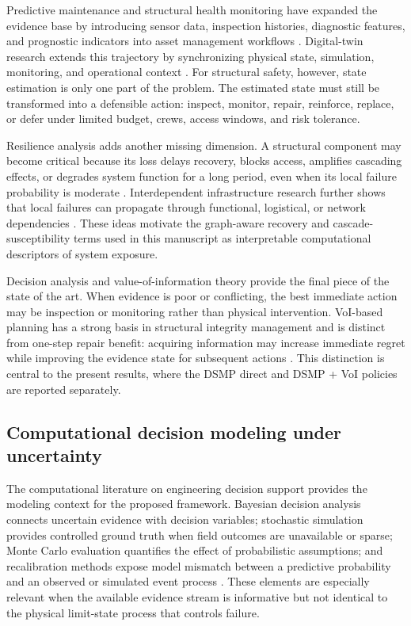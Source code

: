 \documentclass[cmes,article,submit,moreauthors,pdftex]{Definitions/tsp}
\begin{document}
Predictive maintenance and structural health monitoring have expanded the evidence base by introducing sensor data, inspection histories, diagnostic features, and prognostic indicators into asset management workflows \cite{jardine2006,worden2004,carden2004,farrar2007,brownjohn2007}. Digital-twin research extends this trajectory by synchronizing physical state, simulation, monitoring, and operational context \cite{tao2018,tao2019,fuller2020,rasheed2020,boje2020,lu2020}. For structural safety, however, state estimation is only one part of the problem. The estimated state must still be transformed into a defensible action: inspect, monitor, repair, reinforce, replace, or defer under limited budget, crews, access windows, and risk tolerance.

Resilience analysis adds another missing dimension. A structural component may become critical because its loss delays recovery, blocks access, amplifies cascading effects, or degrades system function for a long period, even when its local failure probability is moderate \cite{bruneau2003,cimellaro2010,francis2014,hosseini2016}. Interdependent infrastructure research further shows that local failures can propagate through functional, logistical, or network dependencies \cite{rinaldi2001,ouyang2014,buldyrev2010,gao2012,newman2003}. These ideas motivate the graph-aware recovery and cascade-susceptibility terms used in this manuscript as interpretable computational descriptors of system exposure.

Decision analysis and value-of-information theory provide the final piece of the state of the art. When evidence is poor or conflicting, the best immediate action may be inspection or monitoring rather than physical intervention. VoI-based planning has a strong basis in structural integrity management and is distinct from one-step repair benefit: acquiring information may increase immediate regret while improving the evidence state for subsequent actions \cite{thons2018,memarzadeh2016,papakonstantinou2014a,andriotis2019}. This distinction is central to the present results, where the DSMP direct and DSMP + VoI policies are reported separately.

\subsection{Computational decision modeling under uncertainty}

The computational literature on engineering decision support provides the modeling context for the proposed framework. Bayesian decision analysis connects uncertain evidence with decision variables; stochastic simulation provides controlled ground truth when field outcomes are unavailable or sparse; Monte Carlo evaluation quantifies the effect of probabilistic assumptions; and recalibration methods expose model mismatch between a predictive probability and an observed or simulated event process \cite{beck1998,kennedy2001,helton2006,saltelli2010}. These elements are especially relevant when the available evidence stream is informative but not identical to the physical limit-state process that controls failure.
\end{document}
